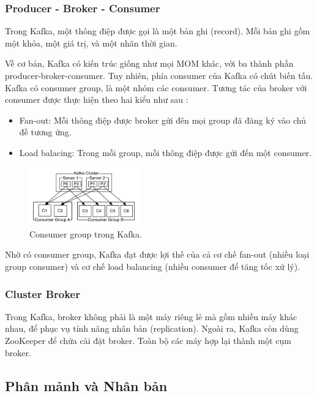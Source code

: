 \documentclass{article}
\begin{document}
\subsubsection{Producer - Broker - Consumer}

Trong Kafka, một thông điệp được gọi là một bản ghi (record). Mỗi bản ghi gồm
một khóa, một giá trị, và một nhãn thời gian.

Về cơ bản, Kafka có kiến trúc giống như mọi MOM khác, với ba thành phần
producer-broker-consumer. Tuy nhiên, phía consumer của Kafka có chút biến tấu.
Kafka có consumer group, là một nhóm các consumer. Tương tác của broker với
consumer được thực hiện theo hai kiểu như sau \cite{kafka_detail}:

\begin{itemize}
    \item Fan-out: Mỗi thông điệp được broker gửi đên mọi group đã đăng ký vào
        chủ đề tương ứng.
    \item Load balacing: Trong mỗi group, mỗi thông điệp được gửi đến một
        consumer.
\end{itemize}

\begin{figure}
    \centering
    \includegraphics[width=0.42\textwidth]{consumer_groups.png}
    \caption{Consumer group trong Kafka.}
\end{figure}

Nhờ có consumer group, Kafka đạt được lợi thế của cả cơ chế fan-out (nhiều loại
group consumer) và cơ chế load balancing (nhiều consumer để tăng tốc xử lý).

\subsubsection{Cluster Broker}

Trong Kafka, broker không phải là một máy riêng lẻ mà gồm nhiều máy khác nhau,
để phục vụ tính năng nhân bản (replication). Ngoài ra, Kafka còn dùng ZooKeeper
để chứa cài đặt broker. Toàn bộ các máy hợp lại thành một cụm broker.

\subsection{Phân mảnh và Nhân bản}
\end{document}

